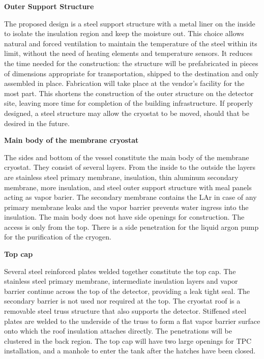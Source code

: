 \textbf{Outer Support Structure}

The proposed design is a steel support structure with a metal liner on the inside to isolate the insulation region and keep the moisture out. This choice allows natural and forced ventilation to maintain the temperature of the steel within its limit, without the need of heating elements and temperature sensors. It reduces the time needed for the construction: the structure will be prefabricated in pieces of dimensions appropriate for transportation, shipped to the destination and only assembled in place. Fabrication will take place at the vendor’s facility for the most part. This shortens the construction of the outer structure on the detector site, leaving more time for completion of the building infrastructure. If properly designed, a steel structure may allow the cryostat to be moved, should that be desired in the future.

\textbf{Main body of the membrane cryostat}

The sides and bottom of the vessel constitute the main body of the membrane cryostat. They consist of several layers. From the inside to the outside the layers are stainless steel primary membrane, insulation, thin aluminum secondary membrane, more insulation, and steel outer support structure with meal panels acting as vapor barier. The secondary membrane contains the LAr in case of any primary membrane leaks and the vapor barrier prevents water ingress into the insulation. The main body does not have side openings for construction. The access is only from the top. There is a side penetration for the liquid argon pump for the purification of the cryogen.

\textbf{Top cap}

Several steel reinforced plates welded together constitute the top cap. The stainless steel primary 
membrane, intermediate insulation layers and vapor barrier continue across the top of the detector, 
providing a leak tight seal. The secondary barrier is not used nor required at the top. The cryostat roof is 
a removable steel truss structure that also supports the detector. Stiffened steel plates are welded to the 
underside of the truss to form a flat vapor barrier surface onto which the roof insulation attaches directly. 
The penetrations will be clustered in the back region. The top cap will have two large openings for TPC 
installation, and a manhole to enter the tank  after the 
hatches have been closed.

